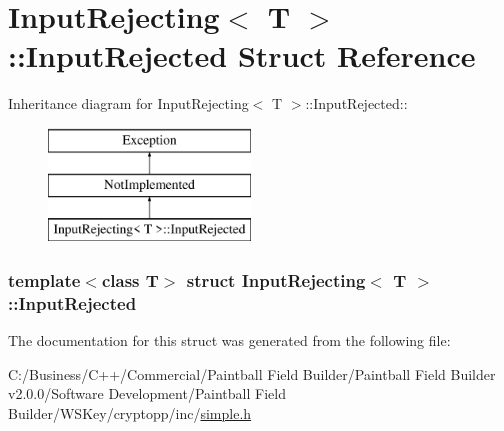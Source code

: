 \hypertarget{struct_input_rejecting_1_1_input_rejected}{
\section{InputRejecting$<$ T $>$::InputRejected Struct Reference}
\label{struct_input_rejecting_1_1_input_rejected}
}
Inheritance diagram for InputRejecting$<$ T $>$::InputRejected::\begin{figure}[H]
\begin{center}
\leavevmode
\includegraphics[height=3cm]{struct_input_rejecting_1_1_input_rejected}
\end{center}
\end{figure}
\subsubsection*{template$<$class T$>$ struct InputRejecting$<$ T $>$::InputRejected}



The documentation for this struct was generated from the following file:\begin{DoxyCompactItemize}
\item 
C:/Business/C++/Commercial/Paintball Field Builder/Paintball Field Builder v2.0.0/Software Development/Paintball Field Builder/WSKey/cryptopp/inc/\hyperlink{simple_8h}{simple.h}\end{DoxyCompactItemize}
